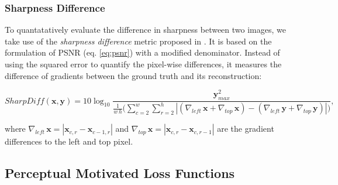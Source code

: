 
\subsubsection*{Sharpness Difference}

To quantatatively evaluate the difference in sharpness between two images, we take use of the \textit{sharpness difference} metric proposed in \parencite{deep_multiscale_video_pred}. It is based on the formulation of PSNR (eq. \ref{eq:psnr}) with a modified denominator. Instead of using the squared error to quantify the pixel-wise differences, it measures the difference of gradients between the ground truth and its reconstruction:

\begin{equation} \label{eq:sharpdiff}
  SharpDiff(\textbf{x}, \textbf{y}) = 10 \log_{10} \frac{\textbf{y}_{max}^2}{\frac{1}{w \, h} \Big(\sum_{c=2}^{w} \sum_{r=2}^{h} |(\nabla_{left} \, \textbf{x} + \nabla_{top} \, \textbf{x})-(\nabla_{left} \, \textbf{y} + \nabla_{top} \, \textbf{y})|\Big)} ,
\end{equation}

where $ \nabla_{left} \, \textbf{x} = |\textbf{x}_{c,r} - \textbf{x}_{c-1, r}| $ and $ \nabla_{top} \, \textbf{x} = |\textbf{x}_{c,r} - \textbf{x}_{c, r-1}| $ are the gradient differences to the left and top pixel.

\subsection{Perceptual Motivated Loss Functions}



